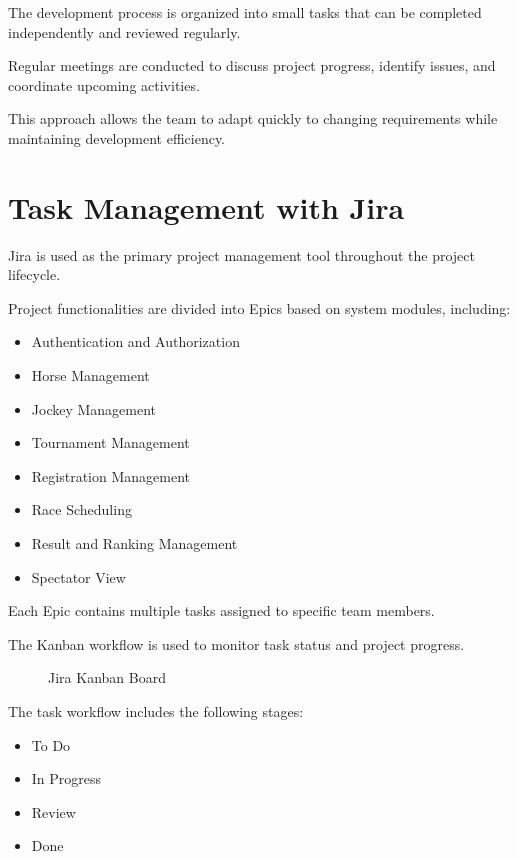 The development process is organized into small tasks that can be completed independently and reviewed regularly.

Regular meetings are conducted to discuss project progress, identify issues, and coordinate upcoming activities.

This approach allows the team to adapt quickly to changing requirements while maintaining development efficiency.

\section{Task Management with Jira}

Jira is used as the primary project management tool throughout the project lifecycle.

Project functionalities are divided into Epics based on system modules, including:

\begin{itemize}
	\item Authentication and Authorization
	\item Horse Management
	\item Jockey Management
	\item Tournament Management
	\item Registration Management
	\item Race Scheduling
	\item Result and Ranking Management
	\item Spectator View
\end{itemize}

Each Epic contains multiple tasks assigned to specific team members.

The Kanban workflow is used to monitor task status and project progress.

\begin{figure}[H]
	\centering
	\caption{Jira Kanban Board}
	\label{fig:jira_board}
\end{figure}

The task workflow includes the following stages:

\begin{itemize}
	\item To Do
	\item In Progress
	\item Review
	\item Done
\end{itemize}

